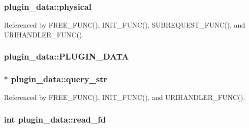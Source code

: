 \hypertarget{structplugin__data_a92e84340ef0ed1b52e33520e203956e2}{
\subsubsection[{physical}]{ plugin\-\_\-data\-::physical}}\label{structplugin__data_a92e84340ef0ed1b52e33520e203956e2}


Referenced by F\-R\-E\-E\-\_\-\-F\-U\-N\-C(), I\-N\-I\-T\-\_\-\-F\-U\-N\-C(), S\-U\-B\-R\-E\-Q\-U\-E\-S\-T\-\_\-\-F\-U\-N\-C(), and U\-R\-I\-H\-A\-N\-D\-L\-E\-R\-\_\-\-F\-U\-N\-C().

\hypertarget{structplugin__data_ae238c7cbb55dc027fedaf363fff6d03a}{
\subsubsection[{P\-L\-U\-G\-I\-N\-\_\-\-D\-A\-T\-A}]{\setlength{\rightskip}{0pt plus 5cm}plugin\-\_\-data\-::\-P\-L\-U\-G\-I\-N\-\_\-\-D\-A\-T\-A}}\label{structplugin__data_ae238c7cbb55dc027fedaf363fff6d03a}
\hypertarget{structplugin__data_aa2a47ebec414dbcdbb77fb2be0cbb205}{
\subsubsection[{query\-\_\-str}]{$\ast$ plugin\-\_\-data\-::query\-\_\-str}}\label{structplugin__data_aa2a47ebec414dbcdbb77fb2be0cbb205}


Referenced by F\-R\-E\-E\-\_\-\-F\-U\-N\-C(), I\-N\-I\-T\-\_\-\-F\-U\-N\-C(), and U\-R\-I\-H\-A\-N\-D\-L\-E\-R\-\_\-\-F\-U\-N\-C().

\hypertarget{structplugin__data_ad53845e63c7202d904506942cd39aa0c}{
\subsubsection[{read\-\_\-fd}]{\setlength{\rightskip}{0pt plus 5cm}int plugin\-\_\-data\-::read\-\_\-fd}}\label{structplugin__data_ad53845e63c7202d904506942cd39aa0c}


